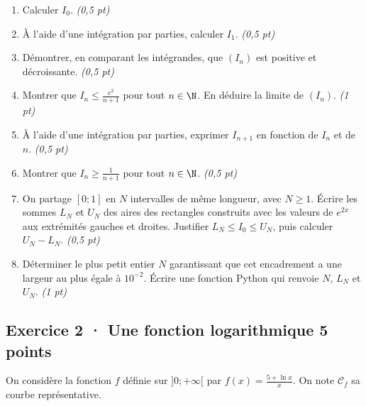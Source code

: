 \begin{enumerate}

\item Calculer $I_0$. \hfill\textit{(0,5 pt)}

\item À l'aide d'une intégration par parties, calculer $I_1$. \hfill\textit{(0,5 pt)}

\item Démontrer, en comparant les intégrandes, que $(I_n)$ est positive et décroissante. \hfill\textit{(0,5 pt)}

\item Montrer que $I_n\le\frac{e^{2}}{n+1}$ pour tout $n\in\N$. En déduire la limite de $(I_n)$. \hfill\textit{(1 pt)}

\item À l'aide d'une intégration par parties, exprimer $I_{n+1}$ en fonction de $I_n$ et de $n$. \hfill\textit{(0,5 pt)}

\item Montrer que $I_n\ge\frac1{n+1}$ pour tout $n\in\N$. \hfill\textit{(0,5 pt)}

\item On partage $[0;1]$ en $N$ intervalles de même longueur, avec $N\ge1$. Écrire les sommes $L_N$ et $U_N$ des aires des rectangles construits avec les valeurs de $e^{2x}$ aux extrémités gauches et droites. Justifier $L_N\le I_0\le U_N$, puis calculer $U_N-L_N$. \hfill\textit{(0,5 pt)}

\item Déterminer le plus petit entier $N$ garantissant que cet encadrement a une largeur au plus égale à $10^{-2}$. Écrire une fonction Python qui renvoie $N$, $L_N$ et $U_N$. \hfill\textit{(1 pt)}

\end{enumerate}

\subsection*{Exercice 2 · Une fonction logarithmique \hfill 5 points}On considère la fonction $f$ définie sur $]0;+\infty[$ par $f(x)=\frac{5+\ln x}x$. On note $\mathcal C_f$ sa courbe représentative.

